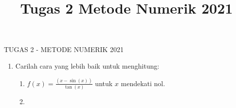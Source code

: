 \documentclass[12pt,a4paper]{report}
\title{Tugas 2 Metode Numerik 2021}
\begin{document}
	\centering TUGAS 2 - METODE NUMERIK 2021
	\begin{enumerate}
		\item Carilah cara yang lebih baik untuk menghitung:
		\begin{enumerate}
			\item $ f(x) = \frac{(x - \sin(x))}{\tan(x)}$ untuk $ x $ mendekati nol.
			\item 
			
		\end{enumerate}
	\end{enumerate}
\end{document}
